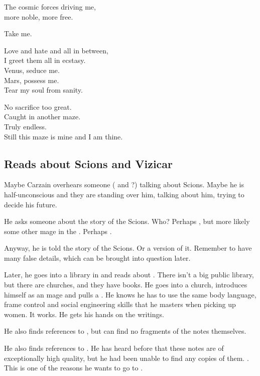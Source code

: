 {  The cosmic forces driving me,\\
  more noble, more free.
  
  Take me.

  Love and hate and all in between,\\
  I greet them all in ecstasy.\\
  Venus, seduce me.\\
  Mars, possess me.\\
  Tear my soul from sanity.
  
  No sacrifice too great.\\
  Caught in another maze.\\
  Truly endless.\\
  Still this maze is mine and I am thine.
}









\subsection{Reads about Scions and Vizicar}
Maybe Carzain overhears someone (\Esmerel{} and \Racel{}?) talking about Scions. 
Maybe he is half-unconscious and they are standing over him, talking about him, trying to decide his future. 

He asks someone about the story of the Scions. 
Who? 
Perhaps \Racel, but more likely some other mage in the \ishrah. 
Perhaps \Sanyor. 

Anyway, he is told the story of the Scions. Or a version of it. Remember to have many false details, which can be brought into question later. 

Later, he goes into a library in \Forklin{} and reads about \VizicarDurasRespina. 
There isn't a big public library, but there are churches, and they have books. 
He goes into a church, introduces himself as an \ishrah{} mage and pulls a .
He knows he has to use the same body language, frame control and social engineering skills that he masters when picking up women.
It works.
He gets his hands on the writings.

He also finds references to , but can find no fragments of the notes themselves. 

He also finds references to . 
He has heard before that these notes are of exceptionally high quality, but he had been unable to find any copies of them. 
. 
This is one of the reasons he wants to go to \Redce. 

